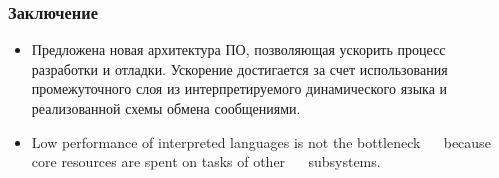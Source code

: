 \documentclass{beamer}
\begin{document}
\begin{frame}
\frametitle{Заключение}
\begin{itemize}
  \item Предложена новая архитектура ПО, позволяющая ускорить
  процесс разработки и отладки. Ускорение достигается за счет использования
  промежуточного слоя из интерпретируемого динамического языка и реализованной
  схемы обмена сообщениями.
  \item Low performance of interpreted languages is not the bottleneck
   because core resources are spent on tasks of other
   subsystems.
\end{itemize}
\end{frame}
\end{document}
